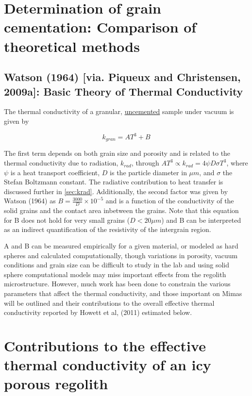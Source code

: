 \documentclass[11pt]{article} %
\begin{document}
\section{Determination of grain cementation: Comparison of theoretical methods}

\subsection{Watson (1964) [via. Piqueux and Christensen, 2009a]: Basic Theory of Thermal Conductivity}

	The thermal conductivity of a granular, \underline{uncemented} sample under vacuum is given by 
	
	\begin{equation}
	k_{gran} = A T^{3} + B
	\end{equation} 
	
	The first term depends on both grain size and porosity and is related to the thermal conductivity due to radiation, $k_{rad}$, through $A T^{3} \varpropto k_{rad} = 4 \psi D \sigma T^{3}$, where $\psi$ is a heat transport coefficient, $D$ is the particle diameter in $\mu m$, and $\sigma$ the Stefan Boltzmann constant. The radiative contribution to heat transfer is discussed further in \ref{sec:krad}. Additionally, the second factor was given by Watson (1964) as $B = \frac{3000}{D}\times10^{-5}$ and is a function of the conductivity of the solid grains and the contact area inbetween the grains. Note that this equation for B does not hold for very small grains ($D<20 \mu m$) and B can be interpreted as an indirect quantification of the resistivity of the intergrain region. 

	A and B can be measured empirically for a given material, or modeled as hard spheres and calculated computationally, though variations in porosity, vacuum conditions and grain size can be difficult to study in the lab and using solid sphere computational models may miss important effects from the regolith microstructure. However, much work has been done to constrain the various parameters that affect the thermal conductivity, and those important on Mimas will be outlined and their contributions to the overall effective thermal conductivity reported by Howett et al, (2011) estimated below. 

\section{Contributions to the effective thermal conductivity of an icy porous regolith}
\end{document}
